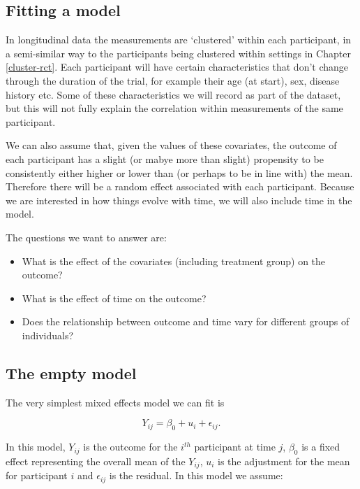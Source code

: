 \documentclass[
  openany]{book}
\providecommand{\tightlist}{%
  \setlength{\itemsep}{0pt}\setlength{\parskip}{0pt}}
\theoremstyle{definition}
\theoremstyle{definition}
\theoremstyle{definition}
\theoremstyle{definition}
\theoremstyle{remark}
\begin{document}
\subsection{Fitting a model}\label{fitting-a-model}

In longitudinal data the measurements are `clustered' within each participant, in a semi-similar way to the participants being clustered within settings in Chapter \ref{cluster-rct}. Each participant will have certain characteristics that don't change through the duration of the trial, for example their age (at start), sex, disease history etc. Some of these characteristics we will record as part of the dataset, but this will not fully explain the correlation within measurements of the same participant.

We can also assume that, given the values of these covariates, the outcome of each participant has a slight (or mabye more than slight) propensity to be consistently either higher or lower than (or perhaps to be in line with) the mean. Therefore there will be a random effect associated with each participant. Because we are interested in how things evolve with time, we will also include time in the model.

The questions we want to answer are:

\begin{itemize}
\tightlist
\item
  What is the effect of the covariates (including treatment group) on the outcome?
\item
  What is the effect of time on the outcome?
\item
  Does the relationship between outcome and time vary for different groups of individuals?
\end{itemize}

\subsection{The empty model}\label{the-empty-model}

The very simplest mixed effects model we can fit is

\begin{equation}
Y_{ij} = \beta_0 + u_{i} + \epsilon_{ij}.
\label{eq:lmer0}
\end{equation}

In this model, \(Y_{ij}\) is the outcome for the \(i^{th}\) participant at time \(j\), \(\beta_0\) is a fixed effect representing the overall mean of the \(Y_{ij}\), \(u_i\) is the adjustment for the mean for participant \(i\) and \(\epsilon_{ij}\) is the residual. In this model we assume:
\end{document}
